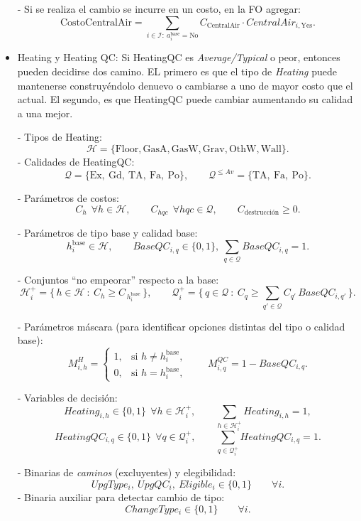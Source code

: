\begin{itemize}
    - Si se realiza el cambio se incurre en un costo, en la FO agregar:
    \[
    \text{CostoCentralAir}
=
      \sum_{i \in \mathcal{I}:\ a_i^{\text{base}} = \text{No}} C_{\text{CentralAir}} \cdot CentralAir_{i,\text{Yes}}.
    \]
    
    \item Heating y Heating QC: Si HeatingQC es \emph{Average/Typical} o peor, entonces pueden decidirse dos camino. EL primero es que el tipo de \textit{Heating} puede mantenerse construyéndolo denuevo o cambiarse a uno de mayor costo que el actual. El segundo, es que HeatingQC puede cambiar aumentando su calidad a una mejor.

- Tipos de Heating:
\[
  \mathcal{H}=\{\text{Floor},\text{GasA},\text{GasW},\text{Grav},\text{OthW},\text{Wall}\}.
\]
- Calidades de HeatingQC:
\[
  \mathcal{Q}=\{\text{Ex},\ \text{Gd},\ \text{TA},\ \text{Fa},\ \text{Po}\},\qquad
  \mathcal{Q}^{\le Av}=\{\text{TA},\ \text{Fa},\ \text{Po}\}.
\]

- Parámetros de costos:
\[
  C_h \ \ \forall h\in\mathcal{H}, \qquad C_{hqc} \ \ \forall hqc\in\mathcal{Q},\qquad
  C_{\text{destrucción}} \ge 0.
\]

- Parámetros de tipo base y calidad base:
\[
  h_i^{\text{base}}\in\mathcal{H},\qquad
  BaseQC_{i,q}\in\{0,1\},\ \sum_{q\in\mathcal{Q}} BaseQC_{i,q}=1.
\]

- Conjuntos “no empeorar” respecto a la base:
\[
  \mathcal{H}_i^+=\{\,h\in\mathcal{H}\ :\ C_h \ge C_{\,h_i^{\text{base}}}\,\},
  \qquad
  \mathcal{Q}_i^+=\{\,q\in\mathcal{Q}\ :\ C_{q} \ge \sum_{q'\in\mathcal{Q}} C_{q'}\, BaseQC_{i,q'}\,\}.
\]

- Parámetros máscara (para identificar opciones distintas del tipo o calidad base):
\[
M^H_{i,h} = 
\begin{cases}
1, & \text{si } h \neq h_i^{\text{base}},\\
0, & \text{si } h = h_i^{\text{base}},
\end{cases}
\qquad
M^{QC}_{i,q} = 1 - BaseQC_{i,q}.
\]

- Variables de decisión:
\[
  Heating_{i,h}\in\{0,1\}\ \ \forall h\in\mathcal{H}_i^+,\qquad
  \sum_{h\in\mathcal{H}_i^+} Heating_{i,h}=1,
\]
\[
  HeatingQC_{i,q}\in\{0,1\}\ \ \forall q\in\mathcal{Q}_i^+,\qquad
  \sum_{q\in\mathcal{Q}_i^+} HeatingQC_{i,q}=1.
\]

- Binarias de \textit{caminos} (excluyentes) y elegibilidad:
\[
  UpgType_i,\ UpgQC_i,\ Eligible_i \in \{0,1\}\qquad \forall i.
\]
- Binaria auxiliar para detectar cambio de tipo:
\[
  ChangeType_i \in \{0,1\} \qquad \forall i.
\]


\end{itemize}
